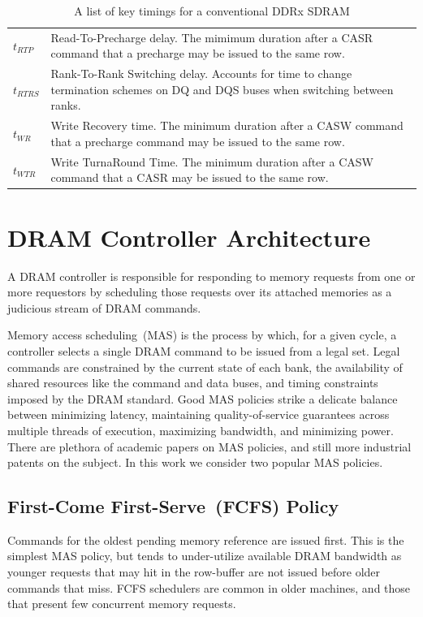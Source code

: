 \begin{table}[htb]
\begin{center}
{\begin{tabular}{|p{}|p{}|}
    \textbf{$t_{RTP}$} & Read-To-Precharge delay. The mimimum duration after a CASR command that a precharge may be issued to the same row. \\
    \textbf{$t_{RTRS}$} & Rank-To-Rank Switching delay. Accounts for time to change termination schemes on DQ and DQS buses when switching between ranks. \\
    \textbf{$t_{WR}$} & Write Recovery time. The minimum duration after a CASW command that a precharge command may be issued to the same row. \\
    \textbf{$t_{WTR}$} & Write TurnaRound Time. The minimum duration after a CASW command that a CASR may be issued to the same row. \\
    \hline
\end{tabular}}
\end{center}
\caption{A list of key timings for a conventional DDRx SDRAM}
\label{tbl:dram-timings}
\end{table}%

\clearpage
\section{DRAM Controller Architecture}

A DRAM controller is responsible for responding to memory
requests from one or more requestors by scheduling those requests over its
attached memories as a judicious stream of DRAM commands.

Memory access scheduling~(MAS) is the process by which, for a given cycle, a
controller selects a single DRAM command to be issued from a legal set. Legal
commands are constrained by the current state of each bank, the availability
of shared resources like the command and data buses, and timing constraints
imposed by the DRAM standard. Good MAS policies strike a delicate balance
between minimizing latency, maintaining quality-of-service guarantees across
multiple threads of execution, maximizing bandwidth, and minimizing power.
There are plethora of academic papers on MAS policies, and still more
industrial patents on the subject. In this work we consider two popular MAS policies. 

\subsection{First-Come First-Serve~(FCFS) Policy}\label{sec:fcfs} Commands for the
oldest pending memory reference are issued first. This is the simplest MAS
policy, but tends to under-utilize available DRAM bandwidth as younger requests
that may hit in the row-buffer are not issued before older commands that miss.
FCFS schedulers are common in older machines, and those that present few
concurrent memory requests.

